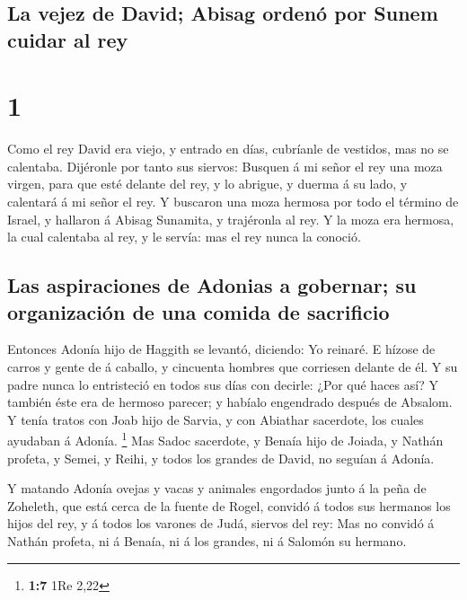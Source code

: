 \hypertarget{la-vejez-de-david-abisag-ordenuxf3-por-sunem-cuidar-al-rey}{%
\subsection{La vejez de David; Abisag ordenó por Sunem cuidar al
rey}\label{la-vejez-de-david-abisag-ordenuxf3-por-sunem-cuidar-al-rey}}

\hypertarget{section}{%
\section{1}\label{section}}

 Como el rey David era viejo, y entrado en días, cubríanle
de vestidos, mas no se calentaba.  Dijéronle por tanto sus
siervos: Busquen á mi señor el rey una moza virgen, para que esté
delante del rey, y lo abrigue, y duerma á su lado, y calentará á mi
señor el rey.  Y buscaron una moza hermosa por todo el
término de Israel, y hallaron á Abisag Sunamita, y trajéronla al rey.
 Y la moza era hermosa, la cual calentaba al rey, y le
servía: mas el rey nunca la conoció.

\hypertarget{las-aspiraciones-de-adonias-a-gobernar-su-organizaciuxf3n-de-una-comida-de-sacrificio}{%
\subsection{Las aspiraciones de Adonias a gobernar; su organización de
una comida de
sacrificio}\label{las-aspiraciones-de-adonias-a-gobernar-su-organizaciuxf3n-de-una-comida-de-sacrificio}}

 Entonces Adonía hijo de Haggith se levantó, diciendo: Yo
reinaré. E hízose de carros y gente de á caballo, y cincuenta hombres
que corriesen delante de él.  Y su padre nunca lo
entristeció en todos sus días con decirle: ¿Por qué haces así? Y también
éste era de hermoso parecer; y habíalo engendrado después de Absalom.
 Y tenía tratos con Joab hijo de Sarvia, y con Abiathar
sacerdote, los cuales ayudaban á Adonía. \footnote{\textbf{1:7} 1Re 2,22}
 Mas Sadoc sacerdote, y Benaía hijo de Joiada, y Nathán
profeta, y Semei, y Reihi, y todos los grandes de David, no seguían á
Adonía.

 Y matando Adonía ovejas y vacas y animales engordados junto
á la peña de Zoheleth, que está cerca de la fuente de Rogel, convidó á
todos sus hermanos los hijos del rey, y á todos los varones de Judá,
siervos del rey:  Mas no convidó á Nathán profeta, ni á
Benaía, ni á los grandes, ni á Salomón su hermano.

